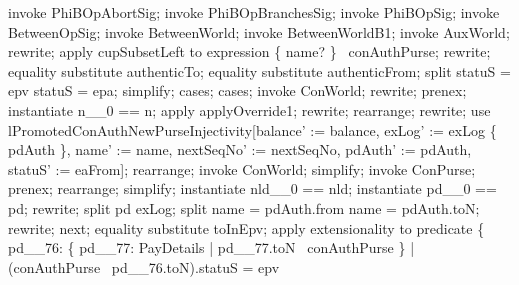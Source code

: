 \newpage
\begin{LPScript}\begin{zproof}[lPromotedAuxWorldAbortType]
    invoke PhiBOpAbortSig;
    invoke PhiBOpBranchesSig;
    invoke PhiBOpSig;
    invoke BetweenOpSig;
    invoke BetweenWorld;
    invoke BetweenWorldB1;
    invoke AuxWorld;
    rewrite;
    apply cupSubsetLeft to expression \{ name? \} \cup \dom~conAuthPurse;
    rewrite;
    equality substitute authenticTo;
    equality substitute authenticFrom;
    split statuS = epv \lor statuS = epa;
    simplify;
    cases;
        cases;
            invoke ConWorld;
            rewrite;
            prenex;
            instantiate n\_\_0 == n;
            apply applyOverride1;
            rewrite;
            rearrange;
            rewrite;
            use lPromotedConAuthNewPurseInjectivity[balance' := balance,
                exLog' := exLog \cup \{ pdAuth \}, name' := name,
                nextSeqNo' := nextSeqNo, pdAuth' := pdAuth,
                statuS' := eaFrom];
            rearrange;
            invoke ConWorld;
            simplify;
            invoke ConPurse;
            prenex;
            rearrange;
            simplify;
            instantiate nld\_\_0 == nld;
            instantiate pd\_\_0 == pd;
            rewrite;
            split pd \in exLog;
            split name = pdAuth.from \lor name = pdAuth.toN;
            rewrite;
        next;
            equality substitute toInEpv;
            apply extensionality to predicate
                \{ pd\_\_76: \{ pd\_\_77: PayDetails | pd\_\_77.toN \in \dom~conAuthPurse \}
                    |  (conAuthPurse~ pd\_\_76.toN).statuS = epv

\end{zproof}
\end{LPScript}
